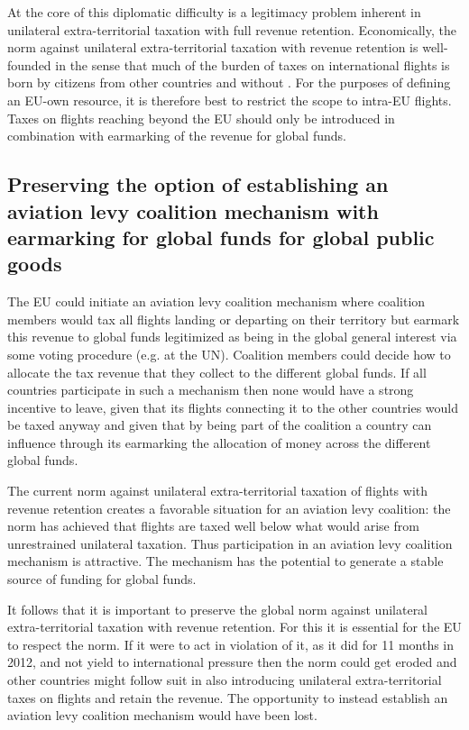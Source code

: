 \documentclass[../../main]{subfiles}
\begin{document}
At the core of this diplomatic difficulty is a legitimacy problem inherent in unilateral extra-territorial taxation with full revenue retention. Economically, the norm against unilateral extra-territorial taxation with revenue retention is well-founded in the sense that much of the burden of taxes on international flights is born by citizens from other countries and without . For the purposes of defining an EU-own resource, it is therefore best to restrict the scope to intra-EU flights. Taxes on flights reaching beyond the EU should only be introduced in combination with earmarking of the revenue for global funds.

\subsection{Preserving the option of establishing an aviation levy coalition mechanism with earmarking for global funds for global public goods}

The EU could initiate an aviation levy coalition mechanism where coalition members would tax all flights landing or departing on their territory but earmark this revenue to global funds legitimized as being in the global general interest via some voting procedure (e.g. at the UN). Coalition members could decide how to allocate the tax revenue that they collect to the different global funds. If all countries participate in such a mechanism then none would have a strong incentive to leave, given that its flights connecting it to the other countries would be taxed anyway and given that by being part of the coalition a country can influence through its earmarking the allocation of money across the different global funds.

The current norm against unilateral extra-territorial taxation of flights with revenue retention creates a favorable situation for an aviation levy coalition: the norm has achieved that flights are taxed well below what would arise from unrestrained unilateral taxation. Thus participation in an aviation levy coalition mechanism is attractive. The mechanism has the potential to generate a stable source of funding for global funds.

It follows that it is important to preserve the global norm against unilateral extra-territorial taxation with revenue retention. For this it is essential for the EU to respect the norm. If it were to act in violation of it, as it did for 11 months in 2012, and not yield to international pressure then the norm could get eroded and other countries might follow suit in also introducing unilateral extra-territorial taxes on flights and retain the revenue. The opportunity to instead establish an aviation levy coalition mechanism would have been lost.


\end{document}
